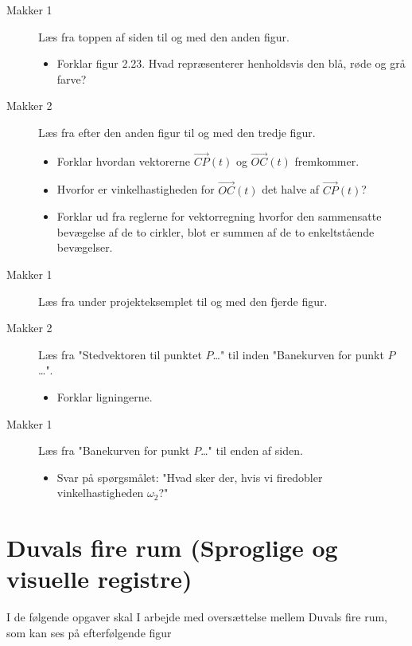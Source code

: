 \documentclass[a4paper, 12pt]{article}
\begin{document}
\begin{description}
\item[{Makker 1}] Læs fra toppen af siden til og med den anden figur.
\begin{itemize}
\item Forklar figur 2.23. Hvad repræsenterer henholdsvis den blå, røde og grå farve?
\end{itemize}

\item[{Makker 2}] Læs fra efter den anden figur til og med den tredje figur.
\begin{itemize}
\item Forklar hvordan vektorerne \(\overrightarrow{CP}(t)\) og \(\overrightarrow{OC}(t)\) fremkommer.
\item Hvorfor er vinkelhastigheden for \(\overrightarrow{OC}(t)\) det halve af \(\overrightarrow{CP}(t)\)?
\item Forklar ud fra reglerne for vektorregning hvorfor den sammensatte bevægelse af de to cirkler, blot er summen af de to enkeltstående bevægelser.
\end{itemize}

\item[{Makker 1}] Læs fra under projekteksemplet til og med den fjerde figur.

\item[{Makker 2}] Læs fra "Stedvektoren til punktet \(P\)\ldots{}" til inden "Banekurven for punkt \(P\)\ldots{}".
\begin{itemize}
\item Forklar ligningerne.
\end{itemize}

\item[{Makker 1}] Læs fra "Banekurven for punkt \(P\)\ldots{}" til enden af siden.
\begin{itemize}
\item Svar på spørgsmålet: "Hvad sker der, hvis vi firedobler vinkelhastigheden \(\omega_2\)?"
\end{itemize}
\end{description}


\section*{Duvals fire rum (Sproglige og visuelle registre)}
\label{sec:org180a6d6}

I de følgende opgaver skal I arbejde med oversættelse mellem Duvals fire rum, som kan ses på efterfølgende figur
\end{document}
